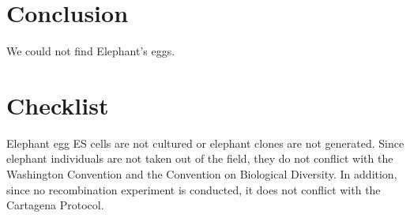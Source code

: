 \section{Conclusion}

We could not find Elephant's eggs.

\section*{Checklist}

Elephant egg ES cells are not cultured or elephant clones are not
generated. Since elephant individuals are not taken out of the field,
they do not conflict with the Washington Convention and the Convention
on Biological Diversity. In addition, since no recombination experiment
is conducted, it does not conflict with the Cartagena Protocol.


